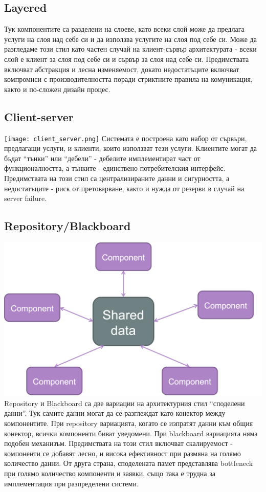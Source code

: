 \documentclass[fleqn,12pt]{article}
\begin{document}
\subsection{Layered}
Тук компонентите са разделени на слоеве, като всеки слой може да предлага услуги на слоя над себе си и да използва услугите на слоя под себе си. Може да разгледаме този стил като частен случай на клиент-сървър архитектурата - всеки слой е клиент за слоя под себе си и сървър за слоя над себе си. Предимствата включват абстракция и лесна изменяемост, докато недостатъците включват компромиси с производителността поради стриктните правила на комуникация, както и по-сложен дизайн процес.

\subsection{Client-server}
\texttt{[image: client\_server.png]}
Системата е построена като набор от сървъри, предлагащи услуги, и клиенти, които използват тези услуги. Клиентите могат да бъдат “тънки” или “дебели” - дебелите имплементират част от функционалността, а тънките - единствено потребителския интерфейс. Предимствата на този стил са централизираните данни и сигурността, а недостатъците - риск от претоварване, както и нужда от резерви в случай на server failure.

\subsection{Repository/Blackboard}
\includegraphics[width=175mm]{shared_memory.png}
Repository и Blackboard са две вариации на архитектурния стил “споделени данни”. Тук самите данни могат да се разглеждат като конектор между компонентите.
При repository вариацията, когато се изпратят данни към общия конектор, всички компоненти биват уведомени. При blackboard вариацията няма подобен механизъм.
Предимствата на този стил включват скалируемост - компоненти се добавят лесно, и висока ефективност при размяна на голямо количество данни. От друга страна, споделената памет представлява bottleneck при голямо количество компоненти и заявки, също така е трудна за имплементация при разпределени системи.
\end{document}
